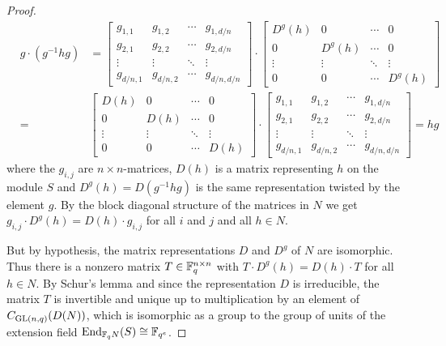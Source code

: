 \begin{proof}
\begin{eqnarray*}
   &g \cdot (g^{-1}hg) & 
 = \left[ \begin{array}{c|c|c|c}
      g_{1,1} & g_{1,2} & \cdots & g_{1,d/n} \\ \hline
      g_{2,1} & g_{2,2} & \cdots & g_{2,d/n} \\ \hline
      \vdots  & \vdots  & \ddots & \vdots    \\ \hline
      g_{d/n,1}&g_{d/n,2}& \cdots& g_{d/n,d/n} \end{array} \right]
\cdot \left[ \begin{array}{c|c|c|c}
      D^g(h) & 0   & \cdots &      0    \\ \hline
         0   &D^g(h)&\cdots &      0    \\ \hline
      \vdots  & \vdots  & \ddots & \vdots    \\ \hline
         0    &    0    & \cdots& D^g(h) \end{array} \right] \\
 &=& \left[ \begin{array}{c|c|c|c}
      D(h)    & 0       & \cdots &     0    \\ \hline
         0    &D(h)     &\cdots &      0    \\ \hline
      \vdots  & \vdots  & \ddots & \vdots    \\ \hline
         0    &    0    & \cdots& D(h)   \end{array} \right]
\cdot \left[ \begin{array}{c|c|c|c}
      g_{1,1} & g_{1,2} & \cdots & g_{1,d/n} \\ \hline
      g_{2,1} & g_{2,2} & \cdots & g_{2,d/n} \\ \hline
      \vdots  & \vdots  & \ddots & \vdots    \\ \hline
      g_{d/n,1}&g_{d/n,2}& \cdots& g_{d/n,d/n} \end{array} \right]
 = hg
\end{eqnarray*}
where the $g_{i,j}$ are $n \times n$-matrices, $D(h)$ is a matrix
representing $h$ on the module $S$ and $D^g(h) = D(g^{-1}hg)$ is the
same representation twisted by the element $g$. By the block diagonal
structure of the matrices in $N$ we get 
$g_{i,j} \cdot D^g(h) = D(h) \cdot g_{i,j}$ for all $i$ and $j$ and 
all $h \in N$.

But by hypothesis, the matrix representations $D$ and $D^g$ of $N$
are isomorphic. Thus there is a nonzero matrix $T \in \mathbb{F}_q^{n \times n}$ with
$T \cdot D^g(h) = D(h) \cdot T$ for all $h \in N$. By Schur's lemma and
since the representation $D$ is irreducible,
the matrix $T$ is invertible and unique 
up to multiplication by an element of $C_{\GL(n,q)}(D(N))$, which
is isomorphic  as a group to the group of units of the extension field 
$\End_{\F_q N}(S) \cong \F_{q^e}$.


\end{proof}
